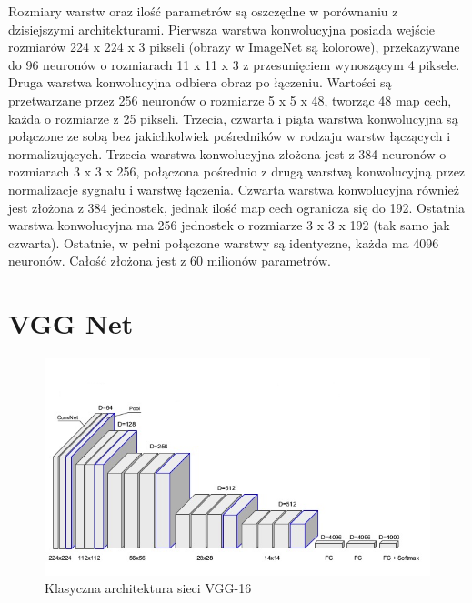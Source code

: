 \documentclass[12pt,a4paper,twoside,titlepage,openright]{book}
\begin{document}
\begin{itemize}
\begin{itemize}
Rozmiary warstw oraz ilość parametrów są oszczędne w porównaniu z dzisiejszymi architekturami. Pierwsza warstwa konwolucyjna posiada wejście rozmiarów 224 x 224 x 3 pikseli (obrazy w ImageNet są kolorowe), przekazywane do 96 neuronów o rozmiarach 11 x 11 x 3 z przesunięciem wynoszącym 4 piksele. Druga warstwa konwolucyjna odbiera obraz po łączeniu. Wartości są przetwarzane przez 256 neuronów o rozmiarze 5 x 5 x 48, tworząc 48 map cech, każda o rozmiarze z 25 pikseli. Trzecia, czwarta i piąta warstwa konwolucyjna są połączone ze sobą bez jakichkolwiek pośredników w rodzaju warstw łączących i normalizujących. Trzecia warstwa konwolucyjna złożona jest z 384 neuronów o rozmiarach 3 x 3 x 256, połączona pośrednio z drugą warstwą konwolucyjną przez normalizacje sygnału i warstwę łączenia. Czwarta warstwa konwolucyjna również jest złożona z 384 jednostek, jednak ilość map cech ogranicza się do 192. Ostatnia warstwa konwolucyjna ma 256 jednostek o rozmiarze 3 x 3 x 192 (tak samo jak czwarta). Ostatnie, w pełni połączone warstwy są identyczne, każda ma 4096 neuronów. Całość złożona jest z 60 milionów parametrów. \cite{NIPS2012_4824}

\section{VGG Net}
\begin{figure}[ht]
	\centering
			\includegraphics[resolution=100, scale=0.8]{VGGarchitecture.png}
		\caption{Klasyczna architektura sieci VGG-16}
\end{figure}


\end{itemize}
\end{itemize}
\end{document}
